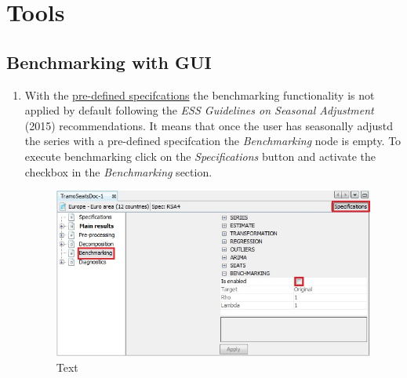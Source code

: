 \documentclass[
  letterpaper,
  DIV=11,
  numbers=noendperiod]{scrreprt}
\begin{document}
\hypertarget{tools-4}{%
\section{Tools}\label{tools-4}}

\hypertarget{benchmarking-with-gui}{%
\subsection{Benchmarking with GUI}\label{benchmarking-with-gui}}

\begin{enumerate}
\def\labelenumi{\arabic{enumi}.}
\item
  With the \href{../reference-manual/sa-specifications.html}{pre-defined
  specifcations} the benchmarking functionality is not applied by
  default following the \emph{ESS Guidelines on Seasonal Adjustment}
  (2015) recommendations. It means that once the user has seasonally
  adjustd the series with a pre-defined specifcation the
  \emph{Benchmarking} node is empty. To execute benchmarking click on
  the \emph{Specifications} button and activate the checkbox in the
  \emph{Benchmarking} section.

  \begin{figure}

  {\centering \includegraphics{./All_images/UDimage1.jpg}

  }

  \caption{Text}

  \end{figure}


\end{enumerate}
\end{document}
